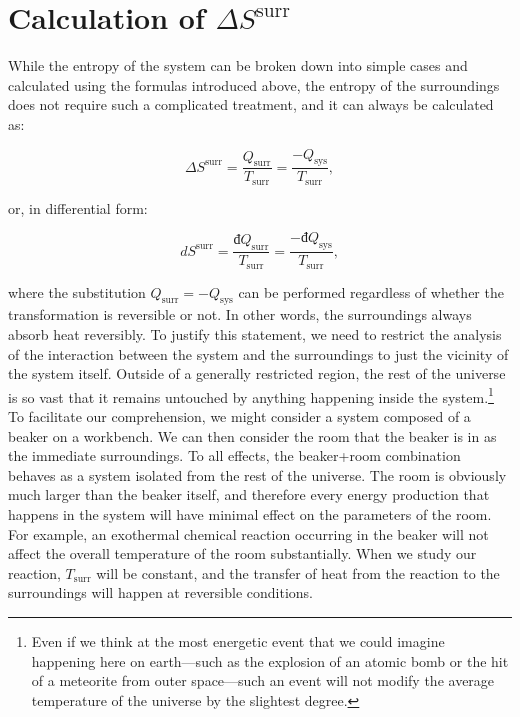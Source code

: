 \documentclass[
  9pt,
]{extbook}
\theoremstyle{definition}
\theoremstyle{definition}
\theoremstyle{definition}
\theoremstyle{definition}
\theoremstyle{remark}
\begin{document}
\section{\texorpdfstring{Calculation of \(\Delta S^{\mathrm{surr}}\)}{Calculation of \textbackslash Delta S\^{}\{\textbackslash mathrm\{surr\}\}}}\label{dssurr}

While the entropy of the system can be broken down into simple cases and calculated using the formulas introduced above, the entropy of the surroundings does not require such a complicated treatment, and it can always be calculated as:

\begin{equation}
\Delta S^{\mathrm{surr}} = \frac{Q_{\text{surr}}}{T_{\text{surr}}}=\frac{-Q_{\text{sys}}}{T_{\text{surr}}},
\label{eq:dssurr}
\end{equation}

or, in differential form:

\begin{equation}
d S^{\mathrm{surr}} = \frac{đQ_{\text{surr}}}{T_{\text{surr}}}=\frac{-đQ_{\text{sys}}}{T_{\text{surr}}},
\label{eq:dssurrd}
\end{equation}

where the substitution \(Q_{\text{surr}}=-Q_{\text{sys}}\) can be performed regardless of whether the transformation is reversible or not. In other words, the surroundings always absorb heat reversibly. To justify this statement, we need to restrict the analysis of the interaction between the system and the surroundings to just the vicinity of the system itself. Outside of a generally restricted region, the rest of the universe is so vast that it remains untouched by anything happening inside the system.\footnote{Even if we think at the most energetic event that we could imagine happening here on earth---such as the explosion of an atomic bomb or the hit of a meteorite from outer space---such an event will not modify the average temperature of the universe by the slightest degree.} To facilitate our comprehension, we might consider a system composed of a beaker on a workbench. We can then consider the room that the beaker is in as the immediate surroundings. To all effects, the beaker+room combination behaves as a system isolated from the rest of the universe. The room is obviously much larger than the beaker itself, and therefore every energy production that happens in the system will have minimal effect on the parameters of the room. For example, an exothermal chemical reaction occurring in the beaker will not affect the overall temperature of the room substantially. When we study our reaction, \(T_{\text{surr}}\) will be constant, and the transfer of heat from the reaction to the surroundings will happen at reversible conditions.
\end{document}

